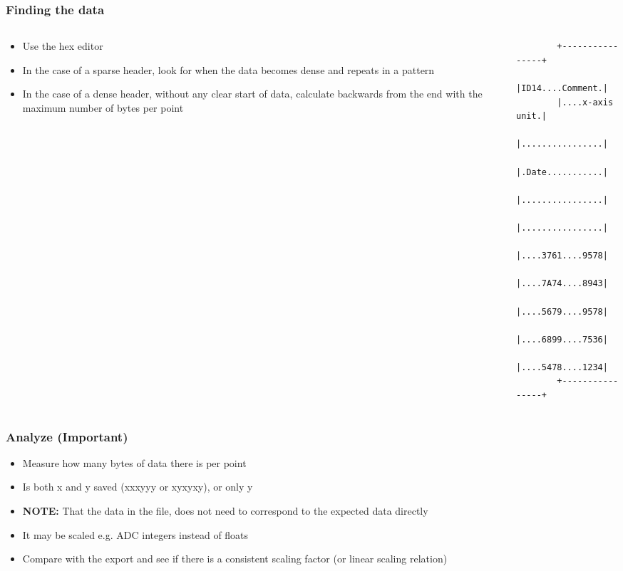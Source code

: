 \documentclass{beamer}
\begin{document}
\begin{frame}[fragile]
  \frametitle{Finding the data}
  \begin{columns}[onlytextwidth]
    \begin{column}{0.5\textwidth}
      \begin{itemize}
      \item Use the hex editor
      \item In the case of a sparse header, look for when the data becomes
        dense and repeats in a pattern
      \item In the case of a dense header, without any clear start of
        data, calculate backwards from the end with the maximum number of
        bytes per point
      \end{itemize}
    \end{column}
    \begin{column}{0.5\textwidth}
      \begin{verbatim}
        +----------------+
        |ID14....Comment.|
        |....x-axis unit.|
        |................|
        |.Date...........|
        |................|
        |................|
        |....3761....9578|
        |....7A74....8943|
        |....5679....9578|
        |....6899....7536|
        |....5478....1234|
        +----------------+
      \end{verbatim}
    \end{column}
  \end{columns}
\end{frame}

\begin{frame}
  \frametitle{Analyze (Important)}
  \begin{itemize}
  \item Measure how many bytes of data there is per point
  \item Is both x and y saved (xxxyyy or xyxyxy), or only y
  \item \textbf{NOTE:} That the data in the file, does not need to
    correspond to the expected data directly
  \item It may be scaled e.g. ADC integers instead of floats
  \item Compare with the export and see if there is a consistent
    scaling factor (or linear scaling relation)
  \end{itemize}
\end{frame}
\end{document}
